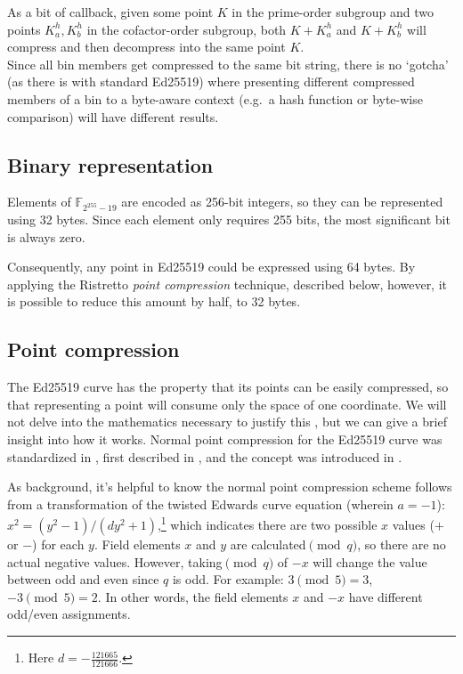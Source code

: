 As a bit of callback, given some point $K$ in the prime-order subgroup and two points $K^h_a, K^h_b$ in the cofactor-order subgroup, both $K + K^h_a$ and $K + K^h_b$ will compress and then decompress into the same point $K$.\\

Since all bin members get compressed to the same bit string, there is no `gotcha' (as there is with standard Ed25519) where presenting different compressed members of a bin to a byte-aware context (e.g.\ a hash function or byte-wise comparison) will have different results.


\subsection{Binary representation}
\label{subsec:binary_note}
Elements of \(\mathbb{F}_{2^{255} - 19} \) are encoded as 256-bit integers, so they can be represented using 32 bytes. Since each element only requires 255 bits, the most significant bit is always zero.

Consequently, any point in Ed25519 could be expressed using 64 bytes. By applying the Ristretto {\em point compression} technique, described below, however, it is possible to reduce this amount by half, to 32 bytes.


\subsection{Point compression}
\label{subsec:point-compression-section}

The Ed25519 curve has the property that its points can be easily compressed, so that representing a point will consume only the space of one coordinate. We will not delve into the mathematics necessary to justify this \cite{ristretto}, but we can give a brief insight into how it works. Normal point compression for the Ed25519 curve was standardized in \cite{eddsa-ed25519-irtf}, first described in \cite{Bernstein2012-high-speed-high-security-ed25519}, and the concept was introduced in \cite{Miller:point-compression-origin}.

As background, it's helpful to know the normal point compression scheme follows from a transformation of the twisted Edwards curve equation (wherein $a = -1$): $x^2 = (y^2-1)/(d y^2+1)$,\footnote{Here $d = - \frac{121665}{121666}$.} which indicates there are two possible $x$ values ($+$ or $-$) for each $y$. Field elements $x$ and $y$ are calculated$\pmod{q}$, so there are no actual negative values. However, taking$\pmod{q}$ of $-x$ will change the value between odd and even since $q$ is odd. For example: $3 \pmod{5} = 3$, $-3 \pmod{5} = 2$. In other words, the field elements $x$ and $-x$ have different odd/even assignments.

